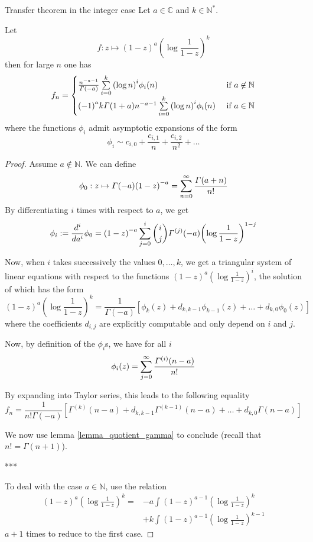 \documentclass[../main.tex]{subfiles}
\begin{document}
\begin{thm}{Transfer theorem in the integer case}
	Let $a \in \mathbb{C}$ and $k \in \mathbb{N}^*$.
	
	Let
	\[
	f : z \mapsto {(1 - z)}^{a} {\left( \log \frac{1}{1 - z} \right)}^k
	\]
	then for large $n$ one has
	\begin{align*}
	f_n =
	\begin{cases}
	\frac{n^{-a-1}}{\Gamma(-a)} \sum\limits_{i = 0}^k {(\log n)}^i \phi_i(n) &\text{ if $a \not\in \mathbb{N}$}\\
	{(-1)}^a k \Gamma(1 + a) n^{-a - 1} \sum\limits_{i = 0}^k {(\log n)}^i \phi_i(n) &\text{ if $a \in \mathbb{N}$}
	\end{cases}
	\end{align*}
	where the functions $\phi_i$ admit asymptotic expansions of the form
	\[
	\phi_i \sim c_{i, 0} + \frac{c_{i, 1}}{n} + \frac{c_{i, 2}}{n^2} + \dots
	\]
\end{thm}

\begin{proof}
	Assume $a \not\in \mathbb{N}$. We can define $$\phi_0 : z \mapsto \Gamma(-a) {(1 - z)}^{-a}
	= \sum\limits_{n = 0}^\infty \frac{\Gamma(a + n)}{n!}$$
	By differentiating $i$ times with respect to $a$, we get
	\begin{equation*}
		\phi_i := \frac{d^i}{da^i} \phi_0 =
		{(1 - z)}^{-a} \sum\limits_{j = 0}^i {i \choose j} \Gamma^{(j)}(-a) {\left(\log \frac{1}{1-z}\right)}^{1-j} 
	\end{equation*}
	
	Now, when $i$ takes successively the values $0, \dots, k$, we get a triangular system of linear equations with respect to the functions ${(1-z)}^{a} {\left(\log \frac{1}{1-z}\right)}^i$, the solution of which has the form
	\[
	{(1-z)}^{a} {\left(\log \frac{1}{1-z}\right)}^k
	= \frac{1}{\Gamma(-a)} \left[ \phi_k(z) + d_{k, k - 1} \phi_{k-1}(z) + \dots + d_{k, 0} \phi_0(z) \right]
	\]
	where the coefficients $d_{i, j}$ are explicitly computable and only depend on $i$ and $j$.
	
	Now, by definition of the $\phi_i$s, we have for all $i$
	\[
	\phi_i(z) = \sum\limits_{j = 0}^\infty \frac{\Gamma^{(i)}(n - a)}{n!}
	\]
	
	By expanding into Taylor series, this leads to the following equality
	\[
	f_n = \frac{1}{n! \Gamma(-a)} \left[
	\Gamma^{(k)}(n - a) + d_{k, k-1} \Gamma^{(k-1)}(n - a)
	+ \dots + d_{k, 0} \Gamma(n - a)
	\right]
	\]
	
	We now use lemma \ref{lemma_quotient_gamma} to conclude (recall that $n! = \Gamma(n + 1)$).

	\begin{center}
		***
	\end{center}
	
	To deal with the case $a \in \mathbb{N}$, use the relation
	\begin{align*}
	{(1 - z)}^a {\left(\log \frac{1}{1 - z}\right)}^k
	= &-a \int {(1 - z)}^{a - 1} {\left(\log \frac{1}{1 - z}\right)}^k\\
	&+ k \int {(1 - z)}^{a - 1} {\left(\log \frac{1}{1 - z}\right)}^{k - 1}
	\end{align*}
	$a + 1$ times to reduce to the first case.
\end{proof}
\end{document}
